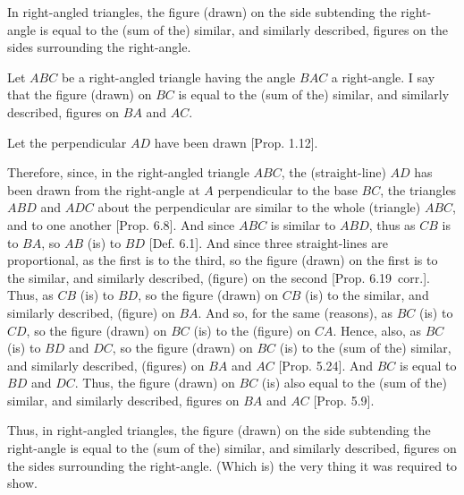 \begin{Parallel}{}{}
{In right-angled triangles, the figure (drawn)
on the side subtending the right-angle is equal to the (sum of the) similar, and similarly
described, figures on the sides surrounding the right-angle.

\epsfysize=2in
\centerline{}

Let $ABC$ be a right-angled triangle having the angle $BAC$ a right-angle. I say
that the figure (drawn) on $BC$ is equal to the (sum of the) similar,
and similarly described, figures on $BA$ and $AC$.

Let the perpendicular $AD$ have been drawn  [Prop. 1.12].

Therefore, since, in the right-angled triangle  $ABC$, the (straight-line) $AD$ has been drawn from the right-angle
at $A$ perpendicular to the base $BC$, the triangles $ABD$
and $ADC$ about the perpendicular are similar to the whole (triangle) $ABC$,
and to one another  [Prop. 6.8].
And since $ABC$ is similar to $ABD$, thus as $CB$ is to $BA$, so $AB$ (is) to
$BD$ [Def. 6.1]. And since three straight-lines
are proportional, as the first is to the third, so the figure (drawn) on the
first is to the similar, and similarly described, (figure) on the second 
[Prop. 6.19~corr.]. Thus, as $CB$ (is) to
$BD$, so the figure (drawn) on $CB$ (is) to the similar, and similarly
described, (figure) on $BA$. And so, for the same (reasons), as $BC$ (is) to
$CD$, so the figure  (drawn) on $BC$ (is) to the (figure) on $CA$. Hence,
also, as $BC$ (is) to $BD$ and $DC$, so the figure (drawn) on $BC$ (is) to
the (sum of the) similar, and similarly described, (figures) on $BA$ and $AC$ [Prop. 5.24].
And $BC$ is equal to $BD$ and $DC$. Thus, the figure (drawn) on $BC$
(is) also equal to the (sum of the) similar, and similarly described, figures
on $BA$ and $AC$ [Prop. 5.9].

Thus, in right-angled triangles, the figure (drawn)
on the side subtending the right-angle is equal to the (sum of the) similar, and similarly
described, figures on the sides surrounding the right-angle. (Which is)
the very thing it was required to show.}
\end{Parallel}

